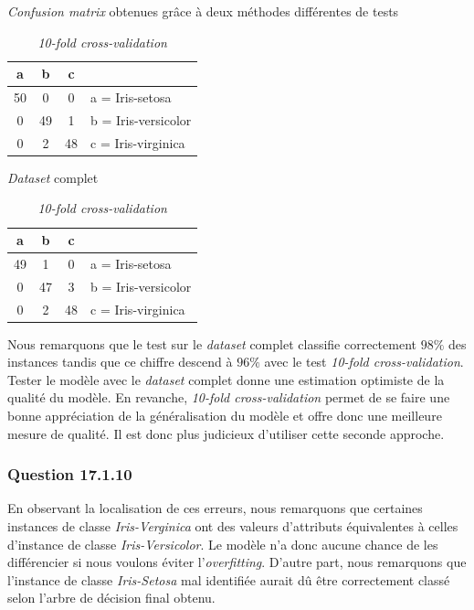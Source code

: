 \documentclass[11pt,a4paper]{article}
\begin{document}
	   			\begin{table}[h]
	   				\centering
	   				\caption{\textit{Confusion matrix} obtenues grâce à deux méthodes différentes de tests}
					\begin{subtable}{0.5\textwidth}
						\centering
						\begin{tabular}{|c|c|c|l|}
							\hline
							a & b & c & \\ 
							\hline
							50 & 0 & 0 & a = Iris-setosa\\
							\hline
							0 & 49 & 1 & b = Iris-versicolor\\
							\hline
							0 & 2 & 48 & c = Iris-virginica\\
							\hline
						\end{tabular}
						\caption{\textit{Dataset} complet}
					\end{subtable}%
					\begin{subtable}{0.5\textwidth}
						\centering
						\begin{tabular}{|c|c|c|l|}
							\hline
							a & b & c & \\ 
							\hline
							49 & 1 & 0 & a = Iris-setosa\\
							\hline
							0 & 47 & 3 & b = Iris-versicolor\\
							\hline
							0 & 2 & 48 & c = Iris-virginica\\
							\hline
						\end{tabular}
						\caption{\textit{10-fold cross-validation}}
					\end{subtable}
	   			\end{table}
 
				 Nous remarquons que le test sur le \textit{dataset} complet classifie correctement $98\%$ des instances tandis que ce chiffre descend à $96\%$ avec le test \textit{10-fold cross-validation}. Tester le modèle avec le \textit{dataset} complet donne une estimation optimiste de la qualité du modèle. En revanche, \textit{10-fold cross-validation} permet de se faire une bonne appréciation de la généralisation du modèle et offre donc une meilleure mesure de qualité. Il est donc plus judicieux d'utiliser cette seconde approche.
				 
			\subsubsection*{Question 17.1.10}
			
				En observant la localisation de ces erreurs, nous remarquons que certaines instances de classe \textit{Iris-Verginica} ont des valeurs d'attributs équivalentes à celles d'instance de classe \textit{Iris-Versicolor}. Le modèle n'a donc aucune chance de les différencier si nous voulons éviter l'\textit{overfitting}. D'autre part, nous remarquons que l'instance de classe \textit{Iris-Setosa} mal identifiée aurait dû être correctement classé selon l'arbre de décision final obtenu. 
		
\end{document}
